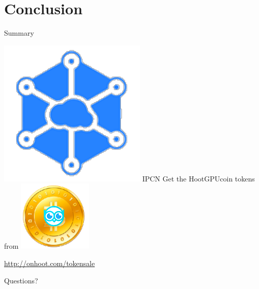 \documentclass[10pt]{beamer}
\begin{document}
\section{Conclusion}

\begin{frame}{Summary}

\includegraphics[scale=.5]{static/ipcn-p2p}
IPCN Get the HootGPUcoin tokens from
\includegraphics[scale=0.5]{static/hootcoin} 
 \begin{center}\url{http://onhoot.com/tokensale}\end{center}




 \begin{center}\ccbysa\end{center}

\end{frame}

\begin{frame}[standout]
 Questions?
\end{frame}
\end{document}
